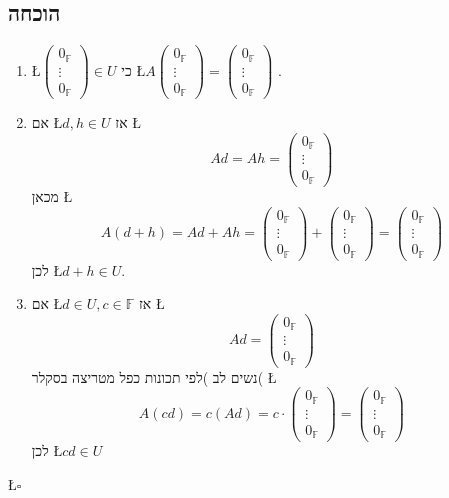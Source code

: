 \documentclass[english,hebrew]{article}
\begin{document}
\subsection{הוכחה}
\begin{enumerate}
\item \L{$\begin{pmatrix}0_{\mathbb{F}}\\
\vdots\\
0_{\mathbb{F}}
\end{pmatrix}\in U$} \quad{}כי\quad{} \L{$A\begin{pmatrix}0_{\mathbb{F}}\\
\vdots\\
0_{\mathbb{F}}
\end{pmatrix}=\begin{pmatrix}0_{\mathbb{F}}\\
\vdots\\
0_{\mathbb{F}}
\end{pmatrix}$} .
\item אם \L{$d,h\in U$} אז \L{%
\[
Ad=Ah=\begin{pmatrix}0_{\mathbb{F}}\\
\vdots\\
0_{\mathbb{F}}
\end{pmatrix}
\]
}%
מכאן \L{%
\[
A(d+h)=Ad+Ah=\begin{pmatrix}0_{\mathbb{F}}\\
\vdots\\
0_{\mathbb{F}}
\end{pmatrix}+\begin{pmatrix}0_{\mathbb{F}}\\
\vdots\\
0_{\mathbb{F}}
\end{pmatrix}=\begin{pmatrix}0_{\mathbb{F}}\\
\vdots\\
0_{\mathbb{F}}
\end{pmatrix}
\]
}%
לכן \L{$d+h\in U$}.
\item אם \L{$d\in U,c\in\mathbb{F}$} אז \L{%
\[
Ad=\begin{pmatrix}0_{\mathbb{F}}\\
\vdots\\
0_{\mathbb{F}}
\end{pmatrix}
\]
}%
נשים לב )לפי תכונות כפל מטריצה בסקלר( \L{%
\[
A(cd)=c(Ad)=c\cdot\begin{pmatrix}0_{\mathbb{F}}\\
\vdots\\
0_{\mathbb{F}}
\end{pmatrix}=\begin{pmatrix}0_{\mathbb{F}}\\
\vdots\\
0_{\mathbb{F}}
\end{pmatrix}
\]
}%
לכן \L{$cd\in U$} 
\end{enumerate}
\begin{flushright}
\L{$\square$}
\par\end{flushright}
\end{document}
